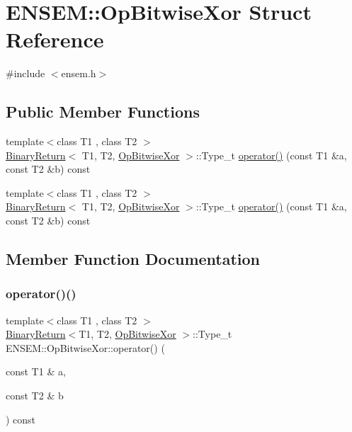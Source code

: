 \hypertarget{structENSEM_1_1OpBitwiseXor}{}\section{E\+N\+S\+EM\+:\+:Op\+Bitwise\+Xor Struct Reference}
\label{structENSEM_1_1OpBitwiseXor}


{\ttfamily \#include $<$ensem.\+h$>$}

\subsection*{Public Member Functions}
\begin{DoxyCompactItemize}
\item 
{\footnotesize template$<$class T1 , class T2 $>$ }\\\mbox{\hyperlink{structENSEM_1_1BinaryReturn}{Binary\+Return}}$<$ T1, T2, \mbox{\hyperlink{structENSEM_1_1OpBitwiseXor}{Op\+Bitwise\+Xor}} $>$\+::Type\+\_\+t \mbox{\hyperlink{structENSEM_1_1OpBitwiseXor_a591fa418b54f1df31f5b4120860f1e42}{operator()}} (const T1 \&a, const T2 \&b) const
\item 
{\footnotesize template$<$class T1 , class T2 $>$ }\\\mbox{\hyperlink{structENSEM_1_1BinaryReturn}{Binary\+Return}}$<$ T1, T2, \mbox{\hyperlink{structENSEM_1_1OpBitwiseXor}{Op\+Bitwise\+Xor}} $>$\+::Type\+\_\+t \mbox{\hyperlink{structENSEM_1_1OpBitwiseXor_a591fa418b54f1df31f5b4120860f1e42}{operator()}} (const T1 \&a, const T2 \&b) const
\end{DoxyCompactItemize}


\subsection{Member Function Documentation}
\mbox{\label{structENSEM_1_1OpBitwiseXor_a591fa418b54f1df31f5b4120860f1e42}} 
\subsubsection{\texorpdfstring{operator()()}{operator()()}\hspace{0.1cm}{\footnotesize\ttfamily [1/2]}}
{\footnotesize\ttfamily template$<$class T1 , class T2 $>$ \\
\mbox{\hyperlink{structENSEM_1_1BinaryReturn}{Binary\+Return}}$<$T1, T2, \mbox{\hyperlink{structENSEM_1_1OpBitwiseXor}{Op\+Bitwise\+Xor}} $>$\+::Type\+\_\+t E\+N\+S\+E\+M\+::\+Op\+Bitwise\+Xor\+::operator() (\begin{DoxyParamCaption}\item[{const T1 \&}]{a,  }\item[{const T2 \&}]{b }\end{DoxyParamCaption}) const\hspace{0.3cm}{\ttfamily [inline]}}

